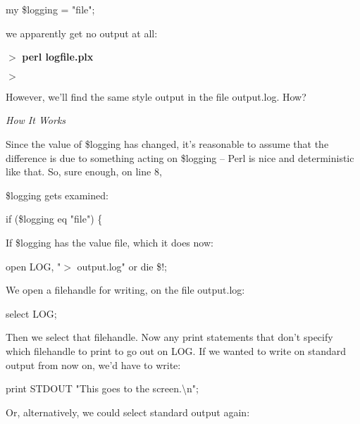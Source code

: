 \documentclass[a4paper,11pt]{book}
\begin{document}
\noindent 

\noindent my \$logging = "file";

\noindent 

\noindent we apparently get no output at all:

\noindent 

\noindent $>$ \textbf{perl logfile.plx}

\noindent $>$

\noindent 

\noindent However, we'll find the same style output in the file output.log. How?

\noindent 

\noindent \textit{How It Works}

\noindent Since the value of \$logging has changed, it's reasonable to assume that the difference is due to something acting on \$logging -- Perl is nice and deterministic like that. So, sure enough, on line 8,

\noindent \$logging gets examined:

\noindent 

\noindent if (\$logging eq "file") \{

\noindent 

\noindent If \$logging has the value file, which it does now:

\noindent 

\noindent 

\noindent open LOG, "$>$ output.log" or die \$!;

\noindent 

\noindent We open a filehandle for writing, on the file output.log:

\noindent 

\noindent 

\noindent select LOG;

\noindent 

\noindent Then we select that filehandle. Now any print statements that don't specify which filehandle to print to go out on LOG. If we wanted to write on standard output from now on, we'd have to write:

\noindent 

\noindent print STDOUT "This goes to the screen.\textbackslash n";

\noindent 

\noindent Or, alternatively, we could select standard output again:

\noindent 

\noindent 
\end{document}
